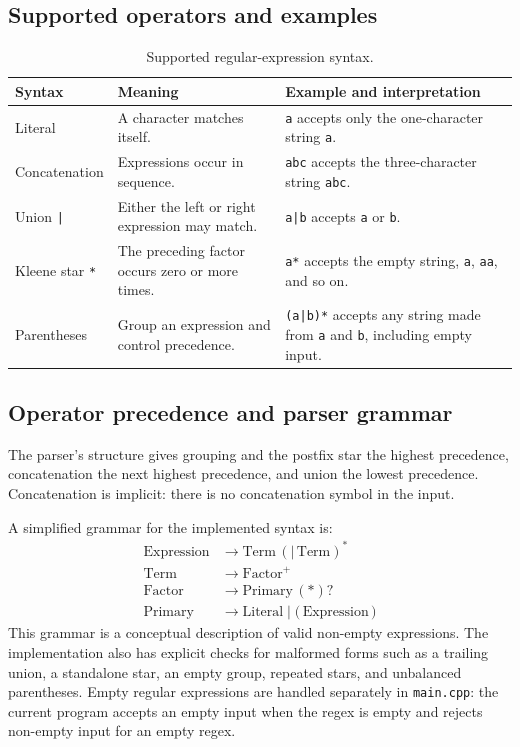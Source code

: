 \documentclass[12pt,a4paper]{report}
\begin{document}
\subsection{Supported operators and examples}
\begin{table}[htbp]
\centering
\caption{Supported regular-expression syntax.}
\label{tab:operators}
\small
\begin{tabular}{|p{2.8cm}|p{4.4cm}|p{6.0cm}|}
\hline
\textbf{Syntax} & \textbf{Meaning} & \textbf{Example and interpretation} \\
\hline
Literal & A character matches itself. & \texttt{a} accepts only the one-character string \texttt{a}. \\
\hline
Concatenation & Expressions occur in sequence. & \texttt{abc} accepts the three-character string \texttt{abc}. \\
\hline
Union \texttt{|} & Either the left or right expression may match. & \texttt{a|b} accepts \texttt{a} or \texttt{b}. \\
\hline
Kleene star \texttt{*} & The preceding factor occurs zero or more times. & \texttt{a*} accepts the empty string, \texttt{a}, \texttt{aa}, and so on. \\
\hline
Parentheses & Group an expression and control precedence. & \texttt{(a|b)*} accepts any string made from \texttt{a} and \texttt{b}, including empty input. \\
\hline
\end{tabular}
\end{table}

\subsection{Operator precedence and parser grammar}
The parser's structure gives grouping and the postfix star the highest precedence, concatenation the next highest precedence, and union the lowest precedence. Concatenation is implicit: there is no concatenation symbol in the input.

A simplified grammar for the implemented syntax is:
\begin{align*}
\text{Expression} &\rightarrow \text{Term}\,(\texttt{|}\,\text{Term})^* \\
\text{Term} &\rightarrow \text{Factor}^+ \\
\text{Factor} &\rightarrow \text{Primary}\,(\texttt{*})? \\
\text{Primary} &\rightarrow \text{Literal}\mid\texttt{(}\,\text{Expression}\,\texttt{)}
\end{align*}
This grammar is a conceptual description of valid non-empty expressions. The implementation also has explicit checks for malformed forms such as a trailing union, a standalone star, an empty group, repeated stars, and unbalanced parentheses. Empty regular expressions are handled separately in \texttt{main.cpp}: the current program accepts an empty input when the regex is empty and rejects non-empty input for an empty regex.
\end{document}
